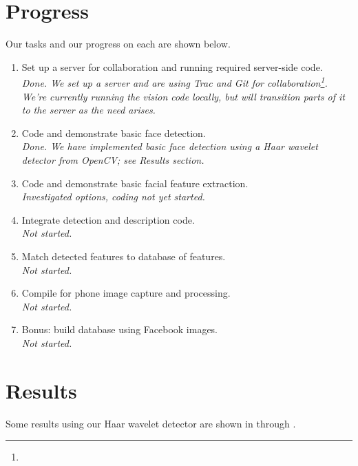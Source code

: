 \section{Progress}

Our tasks and our progress on each are shown below.

\newcommand{\prog}[1]{\textit{\\
#1}}

\begin{enumerate}
\item Set up a server for collaboration and running required
  server-side code.  \prog{Done. We set up a server and are using Trac
    and Git for
    collaboration\footnote{\code{http://cs4670.yosinski.com/}}.  We're
    currently running the vision code locally, but will transition
    parts of it to the server as the need arises.}
\item Code and demonstrate basic face detection.  \prog{Done.  We have
  implemented basic face detection using a Haar wavelet detector from
  OpenCV; see Results section.}
\item Code and demonstrate basic facial feature extraction.
  \prog{Investigated options, coding not yet started.}
\item Integrate detection and description code. \prog{Not started.}
\item Match detected features to database of features. \prog{Not started.}
\item Compile for phone image capture and processing.  \prog{Not started.}
\item Bonus: build database using Facebook images.  \prog{Not started.}
\end{enumerate}



\section{Results}

Some results using our Haar wavelet detector are shown in
 through .



